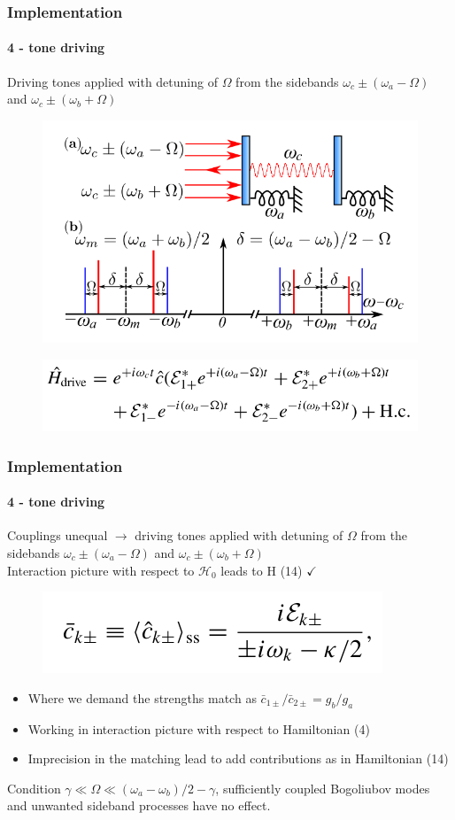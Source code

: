 \documentclass[aspectratio=43]{beamer}
\begin{document}
\begin{frame}
	
	\frametitle{Implementation}
	\framesubtitle{4 - tone driving}
	
	Driving tones applied with detuning of $\Omega$ from the sidebands $\omega_{c} \pm (\omega_{a} - \Omega)$ and $\omega_{c} \pm (\omega_{b} + \Omega)$
	
	\begin{figure}
		\includegraphics[width = 7 cm]{plots/plot_4_tone.png}
	\end{figure}	
	
	\begin{figure}
		\includegraphics[width = 8 cm]{plots/hamiltonian_4_tone.png}
	\end{figure}

\end{frame}

\begin{frame}
	
	\frametitle{Implementation}
	\framesubtitle{4 - tone driving}
	
	Couplings unequal $\longrightarrow$ driving tones applied with detuning of $\Omega$ from the sidebands $\omega_{c} \pm (\omega_{a} - \Omega)$ and $\omega_{c} \pm (\omega_{b} + \Omega)$\\
	Interaction picture with respect to $\mathcal{H}_{0}$ leads to H (14) $\checkmark$
	\begin{figure}
		\includegraphics[width = 5 cm]{plots/ss_4_tone.png}
	\end{figure}

	\begin{itemize}
		\item Where we demand the strengths match as $\bar{c}_{1\pm} / \bar{c}_{2\pm} = g_{b} / g_{a}$
		\item Working in interaction picture with respect to Hamiltonian (4)
		\item Imprecision in the matching lead to add contributions as in Hamiltonian (14)
	\end{itemize}

	Condition $\gamma \ll \Omega \ll (\omega_{a} - \omega_{b})/2 - \gamma$, {\color{blue}sufficiently coupled} Bogoliubov modes and unwanted sideband processes have no effect.

\end{frame}
\end{document}
